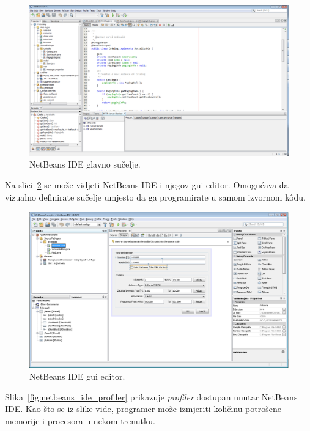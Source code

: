 \begin{figure}[!htbp]
    \caption{NetBeans IDE glavno sučelje.}
    \label{fig:netbeans_ide_overview}
    \centering
    \includegraphics[max width=\textwidth]{images/netbeans_ide_overview.png}
\end{figure}

Na slici~\ref{fig:netbeans_ide_gui_editor} se može vidjeti NetBeans IDE i njegov \gls{gui} editor. Omogućava da vizualno definirate sučelje umjesto da ga programirate u samom izvornom kôdu.

\begin{figure}[!htbp]
    \caption{NetBeans IDE \acrshort{gui} editor.}
    \label{fig:netbeans_ide_gui_editor}
    \centering
    \includegraphics[max width=\textwidth]{images/netbeans_ide_gui_editor.png}
\end{figure}

Slika~\ref{fig:netbeans_ide_profiler} prikazuje \emph{profiler} dostupan unutar NetBeans IDE. Kao što se iz slike vide, programer može izmjeriti količinu potrošene memorije i procesora u nekom trenutku.

